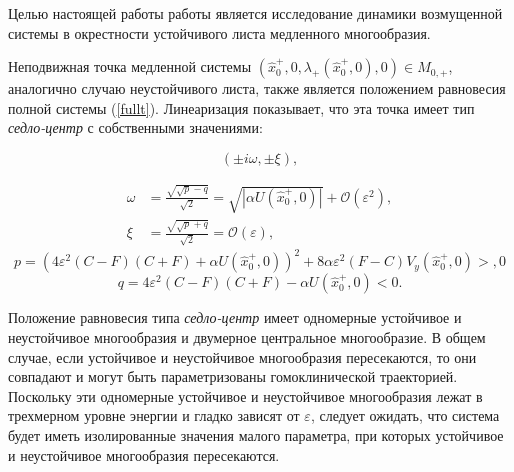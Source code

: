 Целью настоящей работы работы является исследование динамики возмущенной системы в окрестности устойчивого листа медленного многообразия.
    
    Неподвижная точка медленной системы $(\hat x^{+}_0, 0, \lambda_{+}(\hat x^{+}_0, 0), 0) \in M_{0,+}$, аналогично случаю неустойчивого листа, также является положением равновесия полной системы (\ref{fullt}). Линеаризация показывает, что эта точка имеет тип \textit{седло-центр} с собственными значениями:
    
    $$(\pm i \omega, \pm \xi),$$
    
    \begin{align*}
    \omega &= \frac{\sqrt{\sqrt p - q}}{\sqrt 2} = \sqrt{|\alpha U(\hat x_0^+,0)|} + \mathcal{O}(\varepsilon^2), \\
    \xi &=    \frac{\sqrt{\sqrt p + q}}{\sqrt 2} = \mathcal{O}(\varepsilon),
    \label{eigenval}
    \end{align*}
    $$p = (4 \varepsilon^2(C-F)(C+F) + \alpha U(\hat x_0^+,0))^2 + 8 \alpha \varepsilon^2 (F-C) V_y(\hat x_0^+,0) > ,0$$
    $$q = 4 \varepsilon^2 (C-F)(C+F) - \alpha U(\hat x_0^+,0) < 0.$$    

    Положение равновесия типа \textit{седло-центр} имеет одномерные устойчивое и неустойчивое многообразия и двумерное центральное многообразие. В общем случае, если устойчивое и неустойчивое многообразия пересекаются, то они совпадают и могут быть параметризованы гомоклинической траекторией. Поскольку эти одномерные устойчивое и неустойчивое многообразия лежат в трехмерном уровне энергии и гладко зависят от $\varepsilon$, следует ожидать, что система будет иметь изолированные значения малого параметра, при которых  устойчивое и неустойчивое многообразия пересекаются.